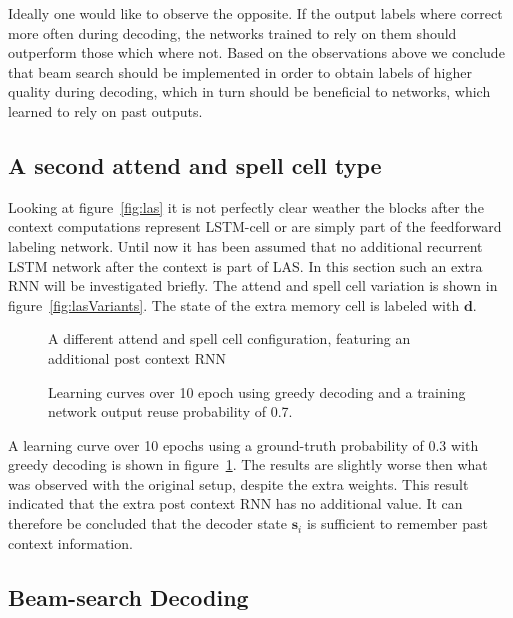 Ideally one would like to observe the opposite. If the output labels where correct more often during decoding, the networks trained to rely on them should outperform those which where not. Based on the observations above we conclude that beam search should be implemented in order to obtain labels of higher quality during decoding, which in turn should be beneficial to networks, which learned to rely on past outputs.

\subsection{A second attend and spell cell type}
Looking at figure~\ref{fig:las} it is not perfectly clear weather the blocks after the context computations represent LSTM-cell or are simply part of the feedforward labeling network. Until now it has been assumed that no additional recurrent LSTM network after the context is part of LAS. In this section such an extra RNN will be investigated briefly. The attend and spell cell variation is shown in figure~\ref{fig:lasVariants}. The state of the extra memory cell is labeled with $\mathbf{d}$.
\begin{figure}
\centering

\caption{A different attend and spell cell configuration, featuring an additional post context RNN}
\label{fig:lasVariants}

\caption{Learning curves over 10 epoch using greedy decoding and a training network output reuse probability of 0.7.}
\label{fig:variantResult}
\end{figure}
A learning curve over 10 epochs using a ground-truth probability of 0.3 with greedy decoding is shown in figure~\ref{fig:variantResult}. The results are slightly worse then what was observed with the original setup, despite the extra weights. This result indicated that the extra post context RNN has no additional value.
It can therefore be concluded that the decoder state $\mathbf{s}_i$ is sufficient to remember past context information.


\subsection{Beam-search Decoding}




